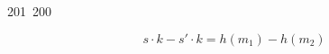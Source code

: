 201~200~\documentclass{article}
\begin{document}
	                                                                        	                                                                    	                                	                    	                    	                        	                        	                    	                                                                	                	                                                                    	                    							                                                                                                                                                                                                    		                                                                                                                        				    	\[
	                                                                        	                                                                    	                                	                    	                    	                        	                        	                    	                                                                	                	                                                                    	                    							                                                                                                                                                                                                    		                                                                                                                        				    		s \cdot k - s' \cdot k = h(m_1) - h(m_2)
	                                                                        	                                                                    	                                	                    	                    	                        	                        	                    	                                                                	                	                                                                    	                    							                                                                                                                                                                                                    		                                                                                                                        				    		\]
\end{document}
